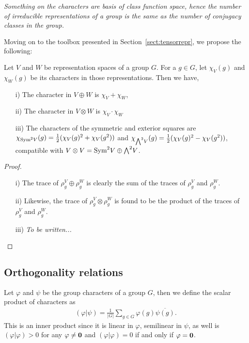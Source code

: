 \textit{Something on the characters are basis of class function space, hence the number of irreducible representations of a group is the same as the number of conjugacy classes in the group.}

Moving on to the toolbox presented in Section~\ref{sect:tensorrepr}, we propose the following:

\begin{proposition}\label{prop:charplustimes}
	Let $V$ and $W$ be representation spaces of a group $G$. For a $g \in G$, let $\chi_V(g)$ and $\chi_W(g)$ be its characters in those representations. Then we have,
	\begin{enumerate}
		\item[i)] The character in $V \oplus W$ is $\chi_V+\chi_W$,
		\item[ii)] The character in $V \otimes W$ is $\chi_V \cdot \chi_W$
		\item[iii)] The characters of the symmetric and exterior squares are $\chi_{\text{Sym}^2 V}(g) = \frac{1}{2}(\chi_V(g)^2 + \chi_V(g^2))$ and $\chi_{{\bigwedge}^2 V}(g) = \frac{1}{2}(\chi_V(g)^2 - \chi_V(g^2))$, compatible with $V \otimes V = \text{Sym}^2 V \oplus {\bigwedge}^2 V$.
	\end{enumerate}
\end{proposition}
\begin{proof}
	\begin{enumerate}
		These topics were treated in Section~\ref{sect:tensoralgebra}.
		\item[i)] The trace of $\rho_g^V \oplus \rho_g^W$ is clearly the sum of the traces of $\rho_g^V$ and $\rho_g^W$.
		\item[ii)] Likewise, the trace of $\rho_g^V \otimes \rho_g^W$ is found to be the product of the traces of $\rho_g^V$ and $\rho_g^W$.
		\item[iii)] \textit{To be written...}
	\end{enumerate}
\end{proof}

\subsection{Orthogonality relations}

Let $\varphi$ and $\psi$ be the group characters of a group $G$, then we define the scalar product of characters as
\begin{align*}
	(\varphi | \psi) = \frac{1}{|G|} \sum_{g \in G} \varphi(g) \overline{\psi(g)}.
\end{align*}
This is an inner product since it is linear in $\varphi$, semilinear in $\psi$, as well is $(\varphi|\varphi) > 0 $ for any $\varphi \neq \mathbf{0}$ and $(\varphi|\varphi)=0$ if and only if $\varphi= \mathbf{0}$.

